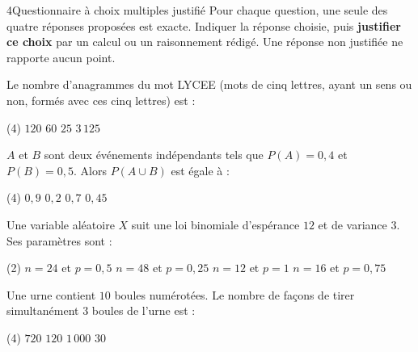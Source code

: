 

\begin{exoBac}{4}{Questionnaire à choix multiples justifié}
Pour chaque question, une seule des quatre réponses proposées est exacte. Indiquer la réponse choisie, puis \textbf{justifier ce
choix} par un calcul ou un raisonnement rédigé. Une réponse non justifiée ne rapporte aucun point.
\begin{questions}
  \item Le nombre d'anagrammes du mot LYCEE (mots de cinq lettres, ayant un sens ou non, formés avec ces cinq lettres) est :
\begin{tasks}[label=\alph*)](4)
  \task $120$
  \task $60$
  \task $25$
  \task $3\,125$
\end{tasks}
  \item $A$ et $B$ sont deux événements indépendants tels que $P(A)=0{,}4$ et $P(B)=0{,}5$. Alors $P(A\cup B)$ est égale à :
\begin{tasks}[label=\alph*)](4)
  \task $0{,}9$
  \task $0{,}2$
  \task $0{,}7$
  \task $0{,}45$
\end{tasks}
  \item Une variable aléatoire $X$ suit une loi binomiale d'espérance $12$ et de variance $3$. Ses paramètres sont :
\begin{tasks}[label=\alph*)](2)
  \task $n=24$ et $p=0{,}5$
  \task $n=48$ et $p=0{,}25$
  \task $n=12$ et $p=1$
  \task $n=16$ et $p=0{,}75$
\end{tasks}
  \item Une urne contient $10$ boules numérotées. Le nombre de façons de tirer simultanément $3$ boules de l'urne est :
\begin{tasks}[label=\alph*)](4)
  \task $720$
  \task $120$
  \task $1\,000$
  \task $30$
\end{tasks}
\end{questions}
\end{exoBac}

